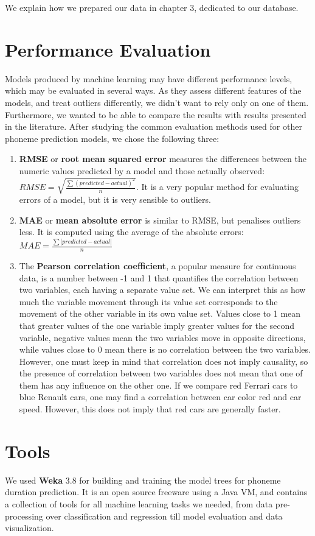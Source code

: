 \documentclass[11pt,a4paper]{scrbook}
\begin{document}
We explain how we prepared our data in chapter 3, dedicated to our database.

\section{Performance Evaluation}
Models produced by machine learning may have different performance levels, which may be evaluated in several ways. As they assess different features of the models, and treat outliers differently, we didn't want to rely only on one of them. Furthermore, we wanted to be able to compare the results with results presented in the literature. After studying the common evaluation methods used for other phoneme prediction models, we chose the following three: 
\begin{enumerate}
	\item \textbf{RMSE} or \textbf{root mean squared error} measures the differences between the numeric values predicted by a model and those actually observed: 
$RMSE = \sqrt{\frac{\sum(predicted-actual)^2}{n}}$. It is a very popular method for evaluating errors of a model, but it is very sensible to outliers.
	\item \textbf{MAE} or \textbf{mean absolute error} is similar to RMSE, but penalises outliers less. It is computed using the average of the absolute errors: $MAE = \frac{\sum\left|predicted-actual\right|}{n}$
	\item The \textbf{Pearson correlation coefficient}, a popular measure for continuous data, is a number between -1 and 1 that quantifies the correlation between two variables, each having a separate value set. We can interpret this as how much the variable movement through its value set corresponds to the movement of the other variable in its own value set. Values close to 1 mean that greater values of the one variable imply greater values for the second variable, negative values mean the two variables move in opposite directions, while values close to 0 mean there is no correlation between the two variables. However, one must keep in mind that correlation does not imply causality, so the presence of correlation between two variables does not mean that one of them has any influence on the other one. If we compare red Ferrari cars to blue Renault cars, one may find a correlation between car color red and car speed. However, this does not imply that red cars are generally faster.
\end{enumerate}

\section{Tools}
We used \textbf{Weka} 3.8 for building and training the model trees for phoneme duration prediction. It is an open source freeware using a Java VM, and contains a collection of tools for all machine learning tasks we needed, from data pre-processing over classification and regression till model evaluation and data visualization.
\end{document}
